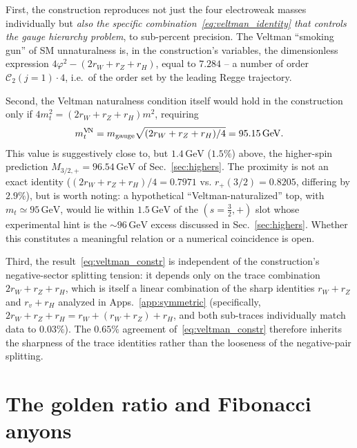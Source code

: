 \documentclass[twocolumn,aps,prd,floatfix,nofootinbib,superscriptaddress,10pt]{article}
\newcommand{\C}{\mathcal{C}}
\newcommand{\GeV}{\,\mathrm{GeV}}
\begin{document}
First, the construction reproduces not just the four electroweak masses individually but {\em also the specific combination~\eqref{eq:veltman_identity} that controls the gauge hierarchy problem}, to sub-percent precision. The Veltman ``smoking gun'' of SM unnaturalness is, in the construction's variables, the dimensionless expression $4\varphi^2-(2r_W+r_Z+r_H)$, equal to $7.284$ -- a number of order $\C_2(j=1)\cdot 4$, i.e.\ of the order set by the leading Regge trajectory.

Second, the Veltman naturalness condition itself would hold in the construction only if $4 m_t^2=(2r_W+r_Z+r_H)m^2$, requiring
\begin{equation}
m_t^{\rm V\!N} = m_{\rm gauge}\sqrt{(2r_W+r_Z+r_H)/4} = 95.15\GeV.
\label{eq:mt_natural}
\end{equation}
This value is suggestively close to, but $1.4\GeV$ ($1.5\%$) above, the higher-spin prediction $M_{3/2,+}=96.54\GeV$ of Sec.~\ref{sec:highers}. The proximity is not an exact identity ($(2r_W+r_Z+r_H)/4=0.7971$ vs. $r_+(3/2)=0.8205$, differing by $2.9\%$), but is worth noting: a hypothetical ``Veltman-naturalized'' top, with $m_t\simeq 95\GeV$, would lie within $1.5\GeV$ of the $(s=\tfrac32,+)$ slot whose experimental hint is the $\sim 96\GeV$ excess discussed in Sec.~\ref{sec:highers}. Whether this constitutes a meaningful relation or a numerical coincidence is open.

Third, the result~\eqref{eq:veltman_constr} is independent of the construction's negative-sector splitting tension: it depends only on the trace combination $2r_W+r_Z+r_H$, which is itself a linear combination of the sharp identities $r_W+r_Z$ and $r_v+r_H$ analyzed in Apps.~\ref{app:symmetric} (specifically, $2r_W+r_Z+r_H=r_W+(r_W+r_Z)+r_H$, and both sub-traces individually match data to $0.03\%$). The $0.65\%$ agreement of~\eqref{eq:veltman_constr} therefore inherits the sharpness of the trace identities rather than the looseness of the negative-pair splitting.

\section{The golden ratio and Fibonacci anyons}
\label{app:phi}
\end{document}

